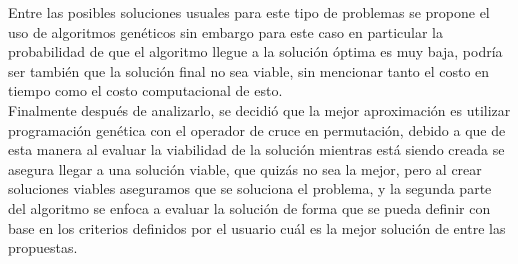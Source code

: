Entre las posibles soluciones usuales para este tipo de problemas se propone el uso de algoritmos genéticos sin embargo para este caso en particular la probabilidad de que el algoritmo llegue a la solución óptima es muy baja, podría ser también que la solución final no sea viable, sin mencionar tanto el costo en tiempo como el costo computacional de esto.\\

Finalmente después de analizarlo, se decidió que la mejor aproximación es utilizar programación genética con el operador de cruce en permutación, debido a que de esta manera al evaluar la viabilidad de la solución mientras está siendo creada se asegura llegar a una solución viable, que quizás no sea la mejor, pero al crear soluciones viables aseguramos que se soluciona el problema, y la segunda parte del algoritmo se enfoca a evaluar la solución de forma que se pueda definir con base en los criterios definidos por el usuario cuál es la mejor solución de entre las propuestas.\\
